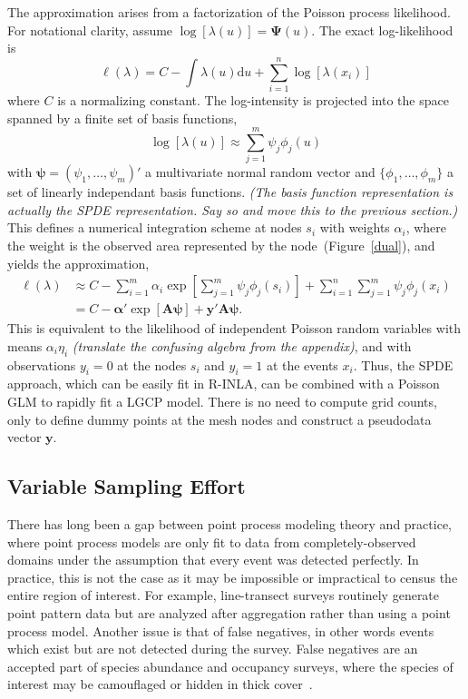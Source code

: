 \documentclass[]{interact}
\begin{document}
The approximation arises from a factorization of the Poisson process
likelihood. For notational clarity, assume \(\log[\lambda(u)]
= \boldsymbol{\Psi}(u)\). The exact log-likelihood is
\begin{displaymath}
\ell(\lambda) = C - \int \lambda(u) \mathrm{d}u
+ \sum_{i = 1}^{n} \log\left[\lambda(x_{i})\right]
\end{displaymath}
where \(C\) is a normalizing constant. The log-intensity is projected into the
space spanned by a finite set of basis functions,
\begin{displaymath}
\log\left[\lambda(u)\right]
\approx \sum_{j = 1}^{m} \psi_{j} \phi_{j}(u)
\end{displaymath}
with \(\boldsymbol{\psi} = (\psi_{1}, \dots, \psi_{m})'\) a multivariate
normal random vector and \(\{\phi_{1}, \dots, \phi_{m}\}\) a set of linearly
independant basis functions.
{\it (The basis function representation is actually the SPDE representation.
Say so and move this to the previous section.)}
This defines a numerical integration scheme at nodes \(s_{i}\)
with weights \(\alpha_{i}\), where the weight is the observed area represented
by the node~(Figure~\ref{dual}), and yields the approximation,
\begin{align*}
\ell(\lambda) &\approx C - \sum_{i = 1}^{m} \alpha_{i}
\exp\left[\sum_{j = 1}^{m} \psi_{j}\phi_{j}(s_{i})\right]
+ \sum_{i = 1}^{n} \sum_{j = 1}^{m} \psi_{j}\phi_{j}(x_{i}) \\
& = C - \boldsymbol{\alpha}'
\exp\left[\mathbf{A} \boldsymbol{\psi}\right]
+ \mathbf{y}' \mathbf{A} \boldsymbol{\psi}.
\end{align*}
This is equivalent to the likelihood of independent Poisson random variables
with means \(\alpha_{i} \eta_{i}\) {\it (translate the confusing algebra from
the appendix)}, and with observations \(y_{i} = 0\) at the nodes \(s_{i}\) and
\(y_{i} = 1\) at the events \(x_{i}\). Thus, the SPDE approach, which can be
easily fit in R-INLA, can be combined with a Poisson GLM to rapidly fit a LGCP
model. There is no need to compute grid counts, only to define dummy points at
the mesh nodes and construct a pseudodata vector \(\mathbf{y}\).


\subsection{Variable Sampling Effort}
\label{veffort}

There has long been a gap between point process modeling theory and practice,
where point process models are only fit to data from completely-observed
domains under the assumption that every event was detected perfectly. In
practice, this is not the case as it may be impossible or impractical to census
the entire region of interest. For example, line-transect surveys routinely
generate point pattern data but are analyzed after aggregation rather than
using a point process model. Another issue is that of false negatives, in other
words events which exist but are not detected during the survey. False
negatives are an accepted part of species abundance and occupancy surveys,
where the species of interest may be camouflaged or hidden in thick
cover~\cite{linkbarker,bucklandetal,mackenzieetal}.
\end{document}
